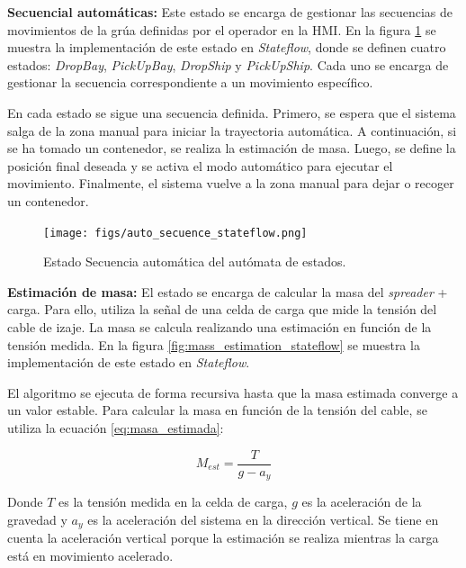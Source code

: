 \documentclass{article}
\begin{document}
        \textbf{Secuencial automáticas:}
            Este estado se encarga de gestionar las secuencias de movimientos de la grúa definidas por el operador en la HMI. En la figura \ref{fig:auto_secuence_stateflow} se muestra la implementación de este estado en \textit{Stateflow}, donde se definen cuatro estados: \textit{DropBay}, \textit{PickUpBay}, \textit{DropShip} y \textit{PickUpShip}. Cada uno se encarga de gestionar la secuencia correspondiente a un movimiento específico.

            En cada estado se sigue una secuencia definida. Primero, se espera que el sistema salga de la zona manual para iniciar la trayectoria automática. A continuación, si se ha tomado un contenedor, se realiza la estimación de masa. Luego, se define la posición final deseada y se activa el modo automático para ejecutar el movimiento. Finalmente, el sistema vuelve a la zona manual para dejar o recoger un contenedor.

            \begin{figure} [H]
                \centering
                \texttt{[image: figs/auto\_secuence\_stateflow.png]}
                \caption{Estado Secuencia automática del autómata de estados.}
                \label{fig:auto_secuence_stateflow}
            \end{figure}

        \textbf{Estimación de masa:}
            El estado se encarga de calcular la masa del \textit{spreader} + carga. Para ello, utiliza la señal de una celda de carga que mide la tensión del cable de izaje. La masa se calcula realizando una estimación en función de la tensión medida. En la figura \ref{fig:mass_estimation_stateflow} se muestra la implementación de este estado en \textit{Stateflow}. 

            El algoritmo se ejecuta de forma recursiva hasta que la masa estimada converge a un valor estable. Para calcular la masa en función de la tensión del cable, se utiliza la ecuación \ref{eq:masa_estimada}:

            \begin{equation} \label{eq:masa_estimada}
                M_{est} = \frac{T}{g - a_{y}}
            \end{equation}

            Donde \(T\) es la tensión medida en la celda de carga, \(g\) es la aceleración de la gravedad y \(a_{y}\) es la aceleración del sistema en la dirección vertical. Se tiene en cuenta la aceleración vertical porque la estimación se realiza mientras la carga está en movimiento acelerado.
\end{document}
